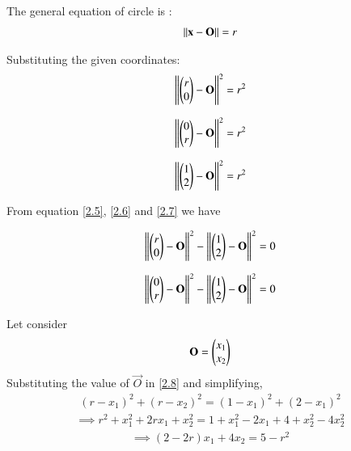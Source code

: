 \documentclass[journal,12pt,twocolumn]{IEEEtran}
\begin{document}
The general equation of circle is :
\begin{align}
\left\lVert\mathbf{x} - \mathbf{O}\right\rVert = r
\end{align}

Substituting the given coordinates:
\begin{align}
\left\lVert  \begin{pmatrix} r \\ 0 \\\end{pmatrix} - \mathbf{O}\right\rVert^{2} = r^{2} \label{2.5}
\end{align}

\begin{align}
\left\lVert  \begin{pmatrix} 0 \\ r \\\end{pmatrix} - \mathbf{O}\right\rVert^{2} = r^{2} \label{2.6}
\end{align}


\begin{align}
\left\lVert  \begin{pmatrix} 1 \\ 2 \\\end{pmatrix} - \mathbf{O}\right\rVert^{2} = r^{2} \label{2.7}
\end{align}

From equation \ref{2.5}, \ref{2.6} and \ref{2.7} we have 

\begin{align}
\left\lVert  \begin{pmatrix} r \\ 0 \\\end{pmatrix} - \mathbf{O}\right\rVert^{2}  - \left\lVert \begin{pmatrix} 1 \\ 2 \\\end{pmatrix}  - \mathbf{O}\right\rVert^{2}   = 0 \label{2.8}
\end{align}

\begin{align}
\left\lVert \begin{pmatrix} 0 \\ r \\\end{pmatrix} - \mathbf{O}\right\rVert^{2}   - \left\lVert\begin{pmatrix} 1 \\ 2 \\\end{pmatrix} - \mathbf{O}\right\rVert^{2}  = 0 \label{2.9}
\end{align}

Let  consider
\begin{align}
\mathbf{O} = \begin{pmatrix}x_1 \\ x_2 \\\end{pmatrix} \label{2.10}
\end{align} 
 Substituting the value of $\vec{O}$ in \ref{2.8} and simplifying,
 \begin{multline}
  \left(r -x_1\right)^{2} +\left(r -x_2\right)^{2} = \left(1 -x_1\right)^{2} + \left(2 -x_1\right)^{2}  \label{2.11}
 \end{multline}
 \begin{multline}
 \implies r^{2} + x_{1}^{2}  + 2rx_1 + x_{2}^{2} = 1 + x_{1}^{2} - 2x_1 + 4 + x_{2}^{2} - 4x_{2}^{2}  \label{2.12}
\end{multline}
\begin{multline}
\implies \left(2 - 2r\right)x_1 + 4x_2 = 5 - r^{2} \label{2.13}
\end{multline}
\end{document}
